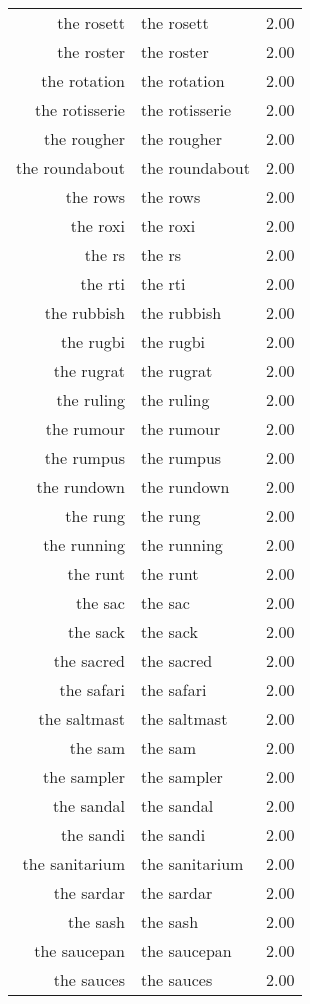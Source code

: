 \begin{table}[ht]
\begin{tabular}{rlr}
  the rosett & the rosett & 2.00 \\ 
  the roster & the roster & 2.00 \\ 
  the rotation & the rotation & 2.00 \\ 
  the rotisserie & the rotisserie & 2.00 \\ 
  the rougher & the rougher & 2.00 \\ 
  the roundabout & the roundabout & 2.00 \\ 
  the rows & the rows & 2.00 \\ 
  the roxi & the roxi & 2.00 \\ 
  the rs & the rs & 2.00 \\ 
  the rti & the rti & 2.00 \\ 
  the rubbish & the rubbish & 2.00 \\ 
  the rugbi & the rugbi & 2.00 \\ 
  the rugrat & the rugrat & 2.00 \\ 
  the ruling & the ruling & 2.00 \\ 
  the rumour & the rumour & 2.00 \\ 
  the rumpus & the rumpus & 2.00 \\ 
  the rundown & the rundown & 2.00 \\ 
  the rung & the rung & 2.00 \\ 
  the running & the running & 2.00 \\ 
  the runt & the runt & 2.00 \\ 
  the sac & the sac & 2.00 \\ 
  the sack & the sack & 2.00 \\ 
  the sacred & the sacred & 2.00 \\ 
  the safari & the safari & 2.00 \\ 
  the saltmast & the saltmast & 2.00 \\ 
  the sam & the sam & 2.00 \\ 
  the sampler & the sampler & 2.00 \\ 
  the sandal & the sandal & 2.00 \\ 
  the sandi & the sandi & 2.00 \\ 
  the sanitarium & the sanitarium & 2.00 \\ 
  the sardar & the sardar & 2.00 \\ 
  the sash & the sash & 2.00 \\ 
  the saucepan & the saucepan & 2.00 \\ 
  the sauces & the sauces & 2.00 \\ 

\end{tabular}
\end{table}
